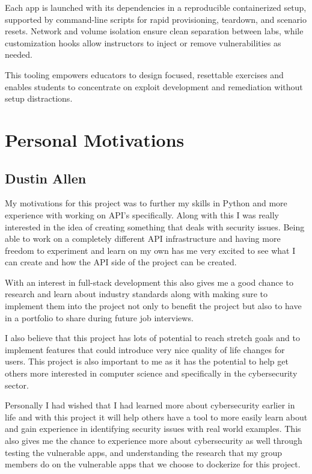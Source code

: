 \documentclass[12pt,titlepage]{article}
\begin{document}
Each app is launched with its dependencies in a reproducible containerized setup, supported by command-line scripts for rapid provisioning, teardown, and scenario resets. Network and volume isolation ensure clean separation between labs, while customization hooks allow instructors to inject or remove vulnerabilities as needed.

This tooling empowers educators to design focused, resettable exercises and enables students to concentrate on exploit development and remediation without setup distractions.

\section{Personal Motivations}

\subsection{Dustin Allen}
My motivations for this project was to further my skills in Python and more experience with working on API’s specifically. Along with this I was really interested in the idea of creating something that deals with security issues. Being able to work on a completely different API infrastructure and having more freedom to experiment and learn on my own has me very excited to see what I can create and how the API side of the project can be created.

With an interest in full-stack development this also gives me a good chance to research and learn about industry standards along with making sure to implement them into the project not only to benefit the project but also to have in a portfolio to share during future job interviews. 

I also believe that this project has lots of potential to reach stretch goals and to implement features that could introduce very nice quality of life changes for users. This project is also important to me as it has the potential to help get others more interested in computer science and specifically in the cybersecurity sector. 

Personally I had wished that I had learned more about cybersecurity earlier in life and with this project it will help others have a tool to more easily learn about and gain experience in identifying security issues with real world examples. This also gives me the chance to experience more about cybersecurity as well through testing the vulnerable apps, and understanding the research that my group members do on the vulnerable apps that we choose to dockerize for this project. 
\end{document}
